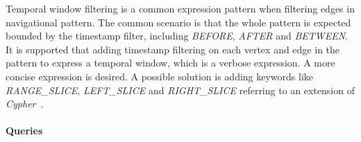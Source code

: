 
Temporal window filtering is a common expression pattern when filtering edges in
navigational pattern. The common scenario is that the whole pattern is expected
bounded by the timestamp filter, including \emph{BEFORE}, \emph{AFTER} and
\emph{BETWEEN}. It is supported that adding timestamp filtering on each vertex
and edge in the pattern to express a temporal window, which is a verbose
expression. A more concise expression is desired. A possible solution is adding
keywords like \emph{RANGE\_SLICE}, \emph{LEFT\_SLICE} and \emph{RIGHT\_SLICE}
referring to an extension of \emph{Cypher}~\cite{tcypher}.


\paragraph{Queries}
{\raggedright
}
